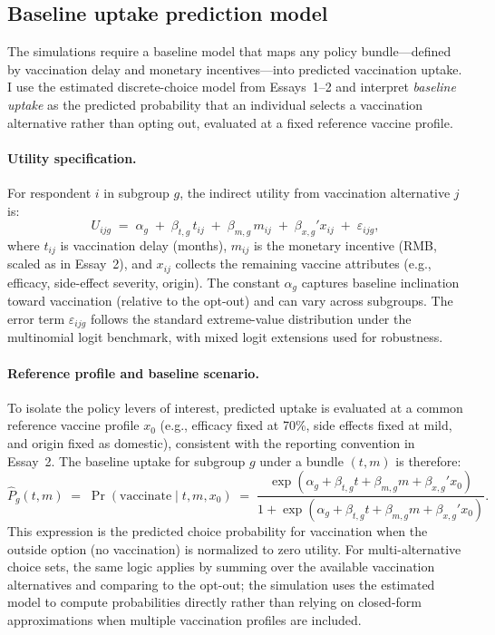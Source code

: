\documentclass[doublespacing]{utdthesis}
\begin{document}
\subsection{Baseline uptake prediction model}
\label{subsec:essay3_baseline_uptake}

The simulations require a baseline model that maps any policy bundle—defined by vaccination delay and monetary incentives—into predicted vaccination uptake. I use the estimated discrete-choice model from Essays~1--2 and interpret \emph{baseline uptake} as the predicted probability that an individual selects a vaccination alternative rather than opting out, evaluated at a fixed reference vaccine profile.

\paragraph{Utility specification.}
For respondent $i$ in subgroup $g$, the indirect utility from vaccination alternative $j$ is:
\begin{equation}
U_{ijg} \;=\; \alpha_{g} \;+\; \beta_{t,g}\,t_{ij} \;+\; \beta_{m,g}\,m_{ij}
\;+\; \beta_{x,g}'x_{ij} \;+\; \varepsilon_{ijg},
\label{eq:utility_baseline}
\end{equation}
where $t_{ij}$ is vaccination delay (months), $m_{ij}$ is the monetary incentive (RMB, scaled as in Essay~2), and $x_{ij}$ collects the remaining vaccine attributes (e.g., efficacy, side-effect severity, origin). The constant $\alpha_g$ captures baseline inclination toward vaccination (relative to the opt-out) and can vary across subgroups. The error term $\varepsilon_{ijg}$ follows the standard extreme-value distribution under the multinomial logit benchmark, with mixed logit extensions used for robustness.

\paragraph{Reference profile and baseline scenario.}
To isolate the policy levers of interest, predicted uptake is evaluated at a common reference vaccine profile $x_0$ (e.g., efficacy fixed at 70\%, side effects fixed at mild, and origin fixed as domestic), consistent with the reporting convention in Essay~2. The baseline uptake for subgroup $g$ under a bundle $(t,m)$ is therefore:
\begin{equation}
\widehat{P}_g(t,m) \;=\; \Pr(\text{vaccinate}\mid t,m,x_0)
\;=\;
\frac{\exp\!\left(\alpha_g + \beta_{t,g}t + \beta_{m,g}m + \beta_{x,g}'x_0\right)}
{1+\exp\!\left(\alpha_g + \beta_{t,g}t + \beta_{m,g}m + \beta_{x,g}'x_0\right)}.
\label{eq:uptake_logit}
\end{equation}
This expression is the predicted choice probability for vaccination when the outside option (no vaccination) is normalized to zero utility. For multi-alternative choice sets, the same logic applies by summing over the available vaccination alternatives and comparing to the opt-out; the simulation uses the estimated model to compute probabilities directly rather than relying on closed-form approximations when multiple vaccination profiles are included.
\end{document}
